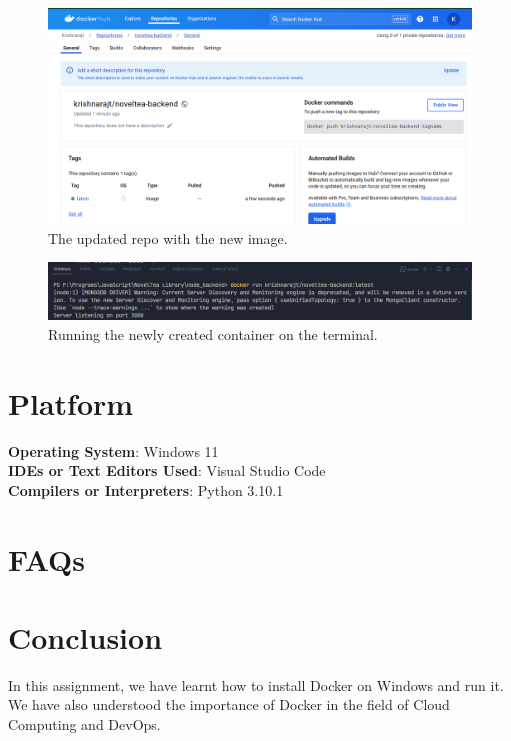 \documentclass[11pt]{article}
\begin{document}
\begin{figure}[H]
    \centering
    \includegraphics[width=.95\textwidth]{updated repo.png}
    \caption{The updated repo with the new image.}
\end{figure}


\begin{figure}[H]
    \centering
    \includegraphics[width=.95\textwidth]{docker container running on terminal.png}
    \caption{Running the newly created container on the terminal.}
\end{figure}


\section{Platform}
\textbf{Operating System}: Windows 11 \\
\textbf{IDEs or Text Editors Used}: Visual Studio Code\\
\textbf{Compilers or Interpreters}: Python 3.10.1\\

% 

\section{FAQs}


\section{Conclusion}
In this assignment, we have learnt how to install Docker on Windows and run it. We have also understood the importance of Docker in the field of Cloud Computing and DevOps.

\clearpage

\pagebreak
\begin{thebibliography}{}

\end{thebibliography}
\end{document}
